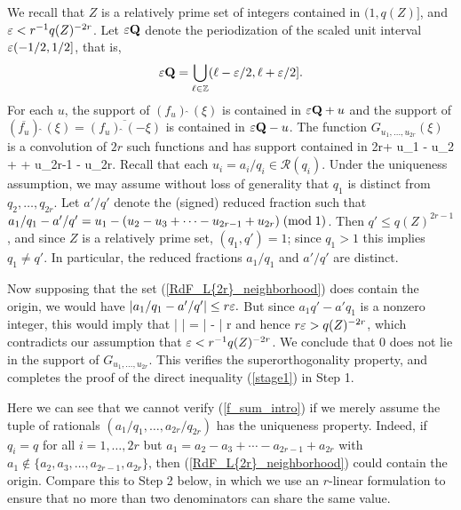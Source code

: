 \documentclass[oneside,11pt]{amsart}
\newcommand{\Rcal}{\mathcal{R}}
\begin{document}
We recall that $Z$ is a relatively prime set of integers contained in $ (1, q(Z)]$, and  $\varepsilon < r^{-1}q(Z)^{-{2r}}$.
Let $\varepsilon \mathbf{Q}$ denote the periodization of the scaled unit interval $\varepsilon (-1/2,1/2]$, that is, 
\[\varepsilon\mathbf{Q} = \bigcup_{\ell \in \mathbb{Z}}    (\ell-\varepsilon/2,\ell+\varepsilon/2].\]
For each $u$, the support of $(f_u)\widehat{\;}(\xi)$ is contained in $\varepsilon \mathbf{Q} + u$ and the support of $(\overline{f_u})\widehat{\;}(\xi) = \overline{(f_u)\widehat{\;}(-\xi)}$ is contained in $\varepsilon \mathbf{Q} -u$. The function $G_{u_1,\ldots,u_{2r}}(\xi) $ is a convolution of $2r$ such functions and  has support 
  contained in  
\beq\label{RdF_L{2r}_neighborhood}
 {2r}\ep \Qbf + u_1 - u_2 + \cdots+ u_{2r-1}  - u_{2r}.
 \eeq
 Recall that each $u_i = a_i/q_i \in \Rcal(q_i)$. 
 Under the uniqueness assumption, we may assume  without loss of generality that $q_1$ is distinct from $q_2,\ldots,  q_{2r}$. 
Let $a'/q'$ denote the (signed) reduced fraction such that $a_1/q_1  - a'/q'  = u_1 - (u_2 - u_3 + \cdots -u_{2r-1} + u_{2r}) \; ( \text{mod} \; 1)$. Then  $q' \leq q(Z)^{2r-1}$, and since $Z$ is a relatively prime set, $(q_1,q')=1$; since $q_1>1$ this implies $q_1 \neq q'$. In particular, the reduced fractions $a_1/q_1$ and $a'/q'$ are distinct.

Now supposing that the  set (\ref{RdF_L{2r}_neighborhood}) does contain the origin, we would have
$
 |a_1/q_1  - a'/q' | \leq r\varepsilon.
$
But since $a_1q'-a'q_1$ is a nonzero integer, this would imply that
\beq\label{RdF_L{2r}_contradiction}
  \leq \left|  \right| =  \left|  -  \right| \leq r\ep
 \eeq
and hence $r \varepsilon> q(Z)^{-2r} $, which contradicts our assumption that
 $\varepsilon < r^{-1}q(Z)^{-{2r}}$.
We conclude that $0$ does not lie in the support of $G_{u_1, \ldots,  u_{2r}}$. 
This verifies the superorthogonality property, and completes the proof of the direct inequality (\ref{stage1}) in Step 1.

\begin{remark}\label{remark_aq_unique}
Here we can see that we cannot verify (\ref{f_sum_intro})  if we merely assume the tuple of rationals $(a_1/q_1,\ldots, a_{2r}/q_{2r})$ has the uniqueness property. Indeed, if $q_i=q$ for all $i=1,\ldots, {2r}$ but  $a_1=a_2-a_3 + \cdots -a_{2r-1}+a_{2r}$ with $a_1 \notin\{a_2,a_3,\ldots, a_{2r-1},a_{2r}\}$, then (\ref{RdF_L{2r}_neighborhood}) could   contain the origin. Compare this to   Step 2 below, in which we use an $r$-linear formulation to ensure that no more than two denominators can share the same value.
\end{remark}
\end{document}
